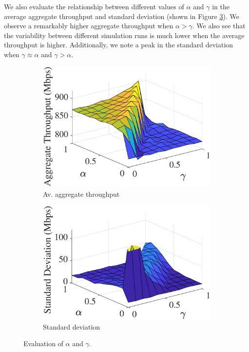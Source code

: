 \documentclass[conference]{IEEEtran}
\begin{document}
	We also evaluate the relationship between different values of $\alpha$ and $\gamma$ in the average aggregate throughput and standard deviation (shown in Figure \ref{fig:ql_alpha_vs_gamma}). We observe a remarkably higher aggregate throughput when $\alpha > \gamma$. We also see that the variability between different simulation runs is much lower when the average throughput is higher. Additionally, we note a peak in the standard deviation when $\gamma \approx \alpha$ and $\gamma > \alpha$. 	
	\begin{figure}[t!]
		\centering
		\begin{subfigure}[(a)]{0.32\textwidth}
			\includegraphics[width=\textwidth]{images/alpha_vs_gamma_avg_tpt_sqrt_epsilon}
			\caption{Av. aggregate throughput}
			\label{fig:alpha_vs_gamma_avg_tpt_sqrt_epsilon}
		\end{subfigure}
		\begin{subfigure}[(b)]{0.32\textwidth}
			\includegraphics[width=\textwidth]{images/alpha_vs_gamma_std_sqrt_epsilon}
			\caption{Standard deviation}
			\label{fig:alpha_vs_gamma_std_sqrt_epsilon}
		\end{subfigure}
		\caption{Evaluation of $\alpha$ and $\gamma$.}
		\label{fig:ql_alpha_vs_gamma}
	\end{figure}	
	
\end{document}
